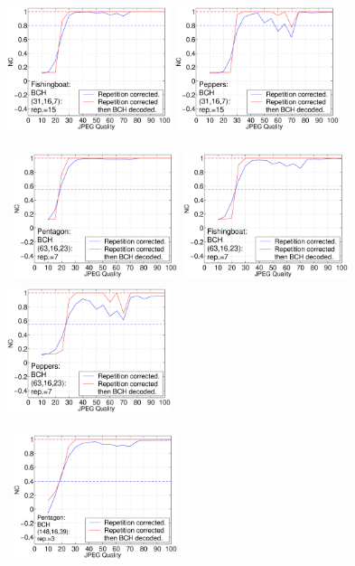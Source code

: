 \documentclass[12pt]{report}
\begin{document}
\begin{figure}[p]
{{\includegraphics[height=3.81cm,width=4.8cm]{EPS_BK_formattedBetter/JPGfish31.eps}
\includegraphics[height=3.81cm,width=4.8cm]{EPS_BK_formattedBetter/JPGpep31.eps}\\
}}
\centerline{ \hbox{
\includegraphics[height=3.81cm,width=4.8cm]{EPS_BK_formattedBetter/JPGpent63.eps}
\includegraphics[height=3.81cm,width=4.8cm]{EPS_BK_formattedBetter/JPGfish63.eps}
\includegraphics[height=3.81cm,width=4.8cm]{EPS_BK_formattedBetter/JPGpep63.eps}\\
}}
\centerline{ \hbox{
\includegraphics[height=3.81cm,width=4.8cm]{EPS_BK_formattedBetter/JPGpent148.eps}
}}
\end{figure}
\end{document}
